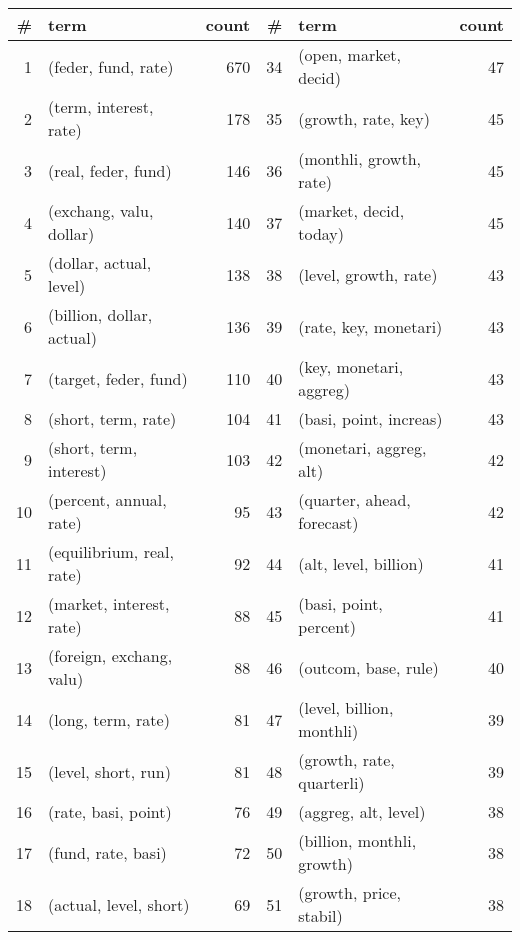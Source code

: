 \begin{tabular}{rlrrlr}
\toprule
  \# &                        term &  count &   \# &                          term &  count \\
\midrule
  1 &         (feder, fund, rate) &    670 &  34 &         (open, market, decid) &     47 \\
  2 &      (term, interest, rate) &    178 &  35 &           (growth, rate, key) &     45 \\
  3 &         (real, feder, fund) &    146 &  36 &       (monthli, growth, rate) &     45 \\
  4 &     (exchang, valu, dollar) &    140 &  37 &        (market, decid, today) &     45 \\
  5 &     (dollar, actual, level) &    138 &  38 &         (level, growth, rate) &     43 \\
  6 &   (billion, dollar, actual) &    136 &  39 &         (rate, key, monetari) &     43 \\
  7 &       (target, feder, fund) &    110 &  40 &       (key, monetari, aggreg) &     43 \\
  8 &         (short, term, rate) &    104 &  41 &        (basi, point, increas) &     43 \\
  9 &     (short, term, interest) &    103 &  42 &       (monetari, aggreg, alt) &     42 \\
 10 &     (percent, annual, rate) &     95 &  43 &    (quarter, ahead, forecast) &     42 \\
 11 &   (equilibrium, real, rate) &     92 &  44 &         (alt, level, billion) &     41 \\
 12 &    (market, interest, rate) &     88 &  45 &        (basi, point, percent) &     41 \\
 13 &    (foreign, exchang, valu) &     88 &  46 &          (outcom, base, rule) &     40 \\
 14 &          (long, term, rate) &     81 &  47 &     (level, billion, monthli) &     39 \\
 15 &         (level, short, run) &     81 &  48 &     (growth, rate, quarterli) &     39 \\
 16 &         (rate, basi, point) &     76 &  49 &          (aggreg, alt, level) &     38 \\
 17 &          (fund, rate, basi) &     72 &  50 &    (billion, monthli, growth) &     38 \\
 18 &      (actual, level, short) &     69 &  51 &       (growth, price, stabil) &     38 \\

\end{tabular}
